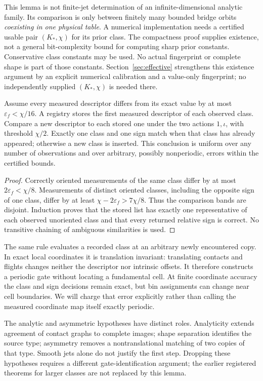 This lemma is not finite-jet determination of an infinite-dimensional
analytic family. Its comparison is only between finitely many bounded
bridge orbits \emph{coexisting in one physical table}. A numerical
implementation needs a certified usable pair $(K_*,\chi)$ for its
prior class. The compactness proof supplies existence, not a general
bit-complexity bound for computing sharp prior constants. Conservative
class constants may be used. No actual fingerprint or complete shape is
part of those constants. Section~\ref{sec:effective} strengthens this
existence argument by an explicit numerical calibration and a value-only
fingerprint; no independently supplied $(K_*,\chi)$ is needed there.

\begin{proposition}
\label{prop:registry}
Assume every measured descriptor differs from its exact value by at most
$\varepsilon_f<\chi/16$. A registry stores the first measured descriptor
of each observed class. Compare a new descriptor to each stored one under
the two actions $1,\iota$, with threshold $\chi/2$.
Exactly one class and one sign match when that class has already appeared;
otherwise a new class is inserted. This conclusion is uniform over any
number of observations and over arbitrary, possibly nonperiodic, errors
within the certified bounds.
\end{proposition}
\begin{proof}
Correctly oriented measurements of the same class differ by at most
$2\varepsilon_f<\chi/8$. Measurements of distinct oriented classes,
including the opposite sign of one class, differ by at least
$\chi-2\varepsilon_f>7\chi/8$. Thus the comparison bands are disjoint.
Induction proves that the stored list has exactly one representative of
each observed unoriented class and that every returned relative sign is
correct. No transitive chaining of ambiguous similarities is used.
\end{proof}

The same rule evaluates a recorded class at an arbitrary newly encountered
copy. In exact local coordinates it is translation invariant: translating
contacts and flights changes neither the descriptor nor intrinsic offsets.
It therefore constructs a periodic gate without locating a fundamental
cell. At finite coordinate accuracy the class and sign decisions remain
exact, but bin assignments can change near cell boundaries. We will charge
that error explicitly rather than calling the measured coordinate map
itself exactly periodic.

The analytic and asymmetric hypotheses have distinct roles. Analyticity
extends agreement of contact graphs to complete images; shape separation
identifies the source type; asymmetry removes a nontranslational matching
of two copies of that type. Smooth jets alone do not justify the first
step. Dropping these hypotheses requires a different gate-identification
argument; the earlier registered theorems for larger classes are not
replaced by this lemma.
